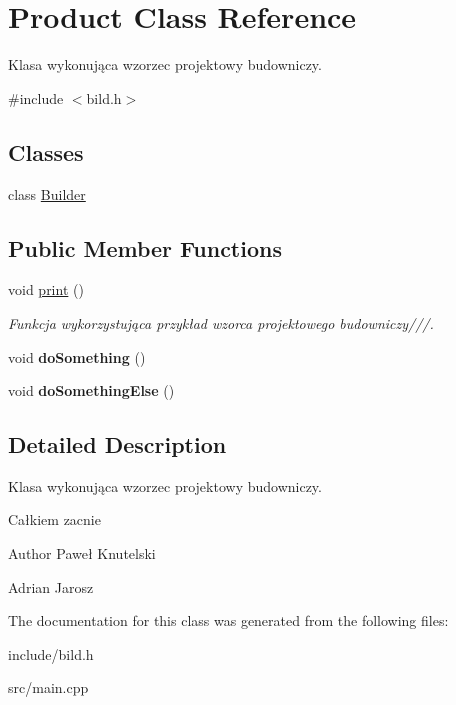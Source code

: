 \hypertarget{class_product}{\section{Product Class Reference}
\label{class_product}
}


Klasa wykonująca wzorzec projektowy budowniczy.  




{\ttfamily \#include $<$bild.\-h$>$}

\subsection*{Classes}
\begin{DoxyCompactItemize}
\item 
class \hyperlink{class_product_1_1_builder}{Builder}
\end{DoxyCompactItemize}
\subsection*{Public Member Functions}
\begin{DoxyCompactItemize}
\item 
\hypertarget{class_product_a82a40e1860ffe2c88ea08084037a6c42}{void \hyperlink{class_product_a82a40e1860ffe2c88ea08084037a6c42}{print} ()}\label{class_product_a82a40e1860ffe2c88ea08084037a6c42}

\begin{DoxyCompactList}\small\item\em Funkcja wykorzystująca przykład wzorca projektowego budowniczy///. \end{DoxyCompactList}\item 
\hypertarget{class_product_a7f4b07a88eb735a731fdec67d6ec4589}{void {\bfseries do\-Something} ()}\label{class_product_a7f4b07a88eb735a731fdec67d6ec4589}

\item 
\hypertarget{class_product_a0a00c5986d95bc8952e45ccfc32817d2}{void {\bfseries do\-Something\-Else} ()}\label{class_product_a0a00c5986d95bc8952e45ccfc32817d2}

\end{DoxyCompactItemize}


\subsection{Detailed Description}
Klasa wykonująca wzorzec projektowy budowniczy. 

Całkiem zacnie

\begin{DoxyAuthor}{Author}
Paweł Knutelski 

Adrian Jarosz 
\end{DoxyAuthor}


The documentation for this class was generated from the following files\-:\begin{DoxyCompactItemize}
\item 
include/bild.\-h\item 
src/main.\-cpp\end{DoxyCompactItemize}
